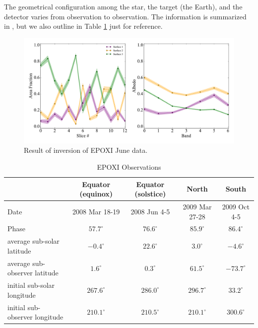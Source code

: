 \documentclass[iop,numberedappendix,apj,]{emulateapj}
\def\memoYF#1{\color{red}{\bf [#1]}\color{black}}
\begin{document}
The geometrical configuration among the star, the target (the Earth), and the detector varies from observation to observation. 
The information is summarized in \citet{Cowan2011}, but we also outline in Table \ref{tab:EPOXI} just for reference. 

\begin{figure}[!bt]
    \begin{center}
    \includegraphics[width=\hsize]{June_xmed_std_GPReg.pdf}
    \end{center}
    \caption{Result of inversion of EPOXI June data. \memoYF{to be revised}}
\label{fig:mcmc_June_tmp}
\end{figure}

\begin{table}[htp]
\caption{EPOXI Observations}
\begin{center}
\begin{tabular}{lcccc} \hline \hline
& Equator (equinox) & Equator (solstice) & North & South \\ \hline
Date & 2008 Mar 18-19 & 2008 Jun 4-5 & 2009 Mar 27-28 & 2009 Oct 4-5 \\ 
Phase & $57.7^{\circ }$ & $76.6^{\circ }$ & $85.9^{\circ }$ & $86.4^{\circ }$ \\ 
average sub-solar latitude & $-0.4^{\circ }$ & $22.6^{\circ }$ & $3.0^{\circ }$ & $-4.6^{\circ }$ \\
average sub-observer latitude & $1.6^{\circ }$ & $0.3^{\circ }$ & $61.5^{\circ }$ & $-73.7^{\circ }$  \\
initial sub-solar longitude & $267.6^{\circ }$ & $286.0^{\circ }$ & $296.7^{\circ }$ & $33.2^{\circ }$ \\
initial sub-observer longitude & $210.1^{\circ }$ & $210.5^{\circ }$ & $210.1^{\circ }$ & $300.6^{\circ }$ \\ \hline
\end{tabular}
\end{center}
\label{tab:EPOXI}
\end{table}%
\end{document}
